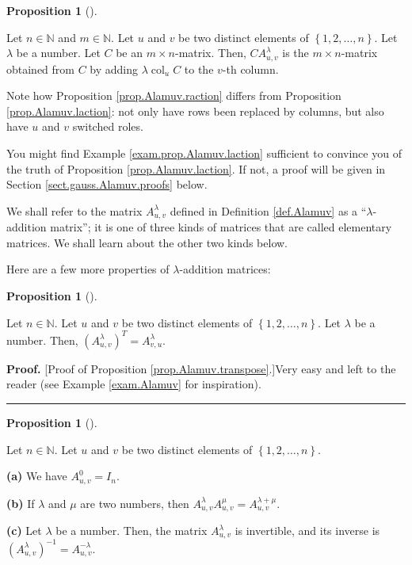 \documentclass[numbers=enddot,12pt,final,onecolumn,notitlepage]{scrartcl}%
\theoremstyle{definition}
\newtheorem{prop}[theo]{Proposition}
\newenvironment{proposition}[1][]
{\begin{prop}[#1]\begin{leftbar}}
{\end{leftbar}\end{prop}}
\newenvironment{proof}[1][Proof]{\noindent\textbf{#1.} }{\ \rule{0.5em}{0.5em}}
\begin{document}
\begin{proposition}
\label{prop.Alamuv.raction}Let $n\in\mathbb{N}$ and $m\in\mathbb{N}$. Let $u$
and $v$ be two distinct elements of $\left\{  1,2,\ldots,n\right\}  $. Let
$\lambda$ be a number. Let $C$ be an $m\times n$-matrix. Then, $CA_{u,v}%
^{\lambda}$ is the $m\times n$-matrix obtained from $C$ by adding
$\lambda\operatorname*{col}\nolimits_{u}C$ to the $v$-th column.
\end{proposition}

Note how Proposition \ref{prop.Alamuv.raction} differs from Proposition
\ref{prop.Alamuv.laction}: not only have rows been replaced by columns, but
also have $u$ and $v$ switched roles.

You might find Example \ref{exam.prop.Alamuv.laction} sufficient to convince
you of the truth of Proposition \ref{prop.Alamuv.laction}. If not, a proof
will be given in Section \ref{sect.gauss.Alamuv.proofs} below.

We shall refer to the matrix $A_{u,v}^{\lambda}$ defined in Definition
\ref{def.Alamuv} as a \textquotedblleft$\lambda$-addition
matrix\textquotedblright; it is one of three kinds of matrices that are called
elementary matrices. We shall learn about the other two kinds below.

Here are a few more properties of $\lambda$-addition matrices:

\begin{proposition}
\label{prop.Alamuv.transpose}Let $n\in\mathbb{N}$. Let $u$ and $v$ be two
distinct elements of $\left\{  1,2,\ldots,n\right\}  $. Let $\lambda$ be a
number. Then, $\left(  A_{u,v}^{\lambda}\right)  ^{T}=A_{v,u}^{\lambda}$.
\end{proposition}

\begin{proof}
[Proof of Proposition \ref{prop.Alamuv.transpose}.]Very easy and left to the
reader (see Example \ref{exam.Alamuv} for inspiration).
\end{proof}

\begin{proposition}
\label{prop.Alamuv.lambda+mu}Let $n\in\mathbb{N}$. Let $u$ and $v$ be two
distinct elements of $\left\{  1,2,\ldots,n\right\}  $.

\textbf{(a)} We have $A_{u,v}^{0}=I_{n}$.

\textbf{(b)} If $\lambda$ and $\mu$ are two numbers, then $A_{u,v}^{\lambda
}A_{u,v}^{\mu}=A_{u,v}^{\lambda+\mu}$.

\textbf{(c)} Let $\lambda$ be a number. Then, the matrix $A_{u,v}^{\lambda}$
is invertible, and its inverse is $\left(  A_{u,v}^{\lambda}\right)
^{-1}=A_{u,v}^{-\lambda}$.
\end{proposition}
\end{document}
